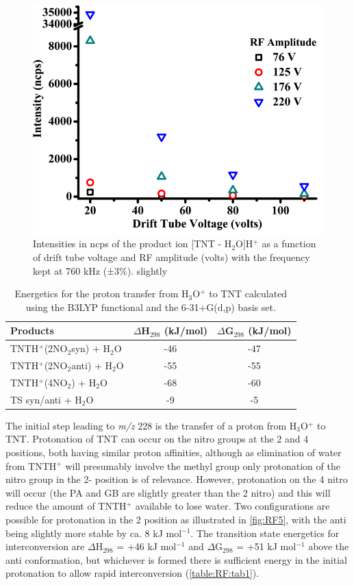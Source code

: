 \begin{figure}%
\centering
\includegraphics[height=0.3\textheight]{pics/RFpaper_fig4.png}
\caption{Intensities in ncps of the product ion [TNT - H$_2$O]H$^+$ as a function of drift tube voltage and RF amplitude (volts) with the frequency kept at 760 kHz (±3\%).
slightly}
\label{fig:RF4}
\end{figure}

\begin{table}%
\caption{Energetics for the proton transfer from H$_3$O$^+$ to TNT calculated using the B3LYP functional and the 6-31+G(d,p) basis set.}
\label{table:RF:tab1}
\begin{tabular}{lcc}
\hline
\textbf{Products} & \textbf{$\Delta$H$_{298}$ (kJ/mol)} & \textbf{$\Delta$G$_{298}$ (kJ/mol)} \\
\hline
TNTH$^+$(2NO$_2$syn) + H$_2$O  & -46   & -47     \\
TNTH$^+$(2NO$_2$anti) + H$_2$O & -55   & -55     \\
TNTH$^+$(4NO$_2$) + H$_2$O     & -68   & -60     \\
TS syn/anti + H$_2$O          & -9    & -5      \\ 
\hline
\end{tabular}
\end{table}

The initial step leading to \textit{m/z} 228 is the transfer of a proton from H$_3$O$^+$ to TNT. Protonation of TNT can occur on the nitro groups at the 2 and 4 positions, both having similar proton affinities, although as elimination of water from TNTH$^+$ will presumably involve the methyl group only protonation of the nitro group in the 2- position is of relevance. However, protonation on the 4 nitro will occur (the PA and GB are slightly greater than the 2 nitro) and this will reduce the amount of TNTH$^+$ available to lose water. Two configurations are
possible for protonation in the 2 position as illustrated in \autoref{fig:RF5}, with the anti being slightly more stable by ca. 8 kJ mol$^{-1}$. The transition state energetics for interconversion are $\Delta$H$_{298}$ = +46 kJ mol$^{-1}$ and $\Delta$G$_{298}$ = +51 kJ mol$^{-1}$ above the anti conformation, but whichever is
formed there is sufficient energy in the initial protonation to allow rapid interconversion (\autoref{table:RF:tab1}).


